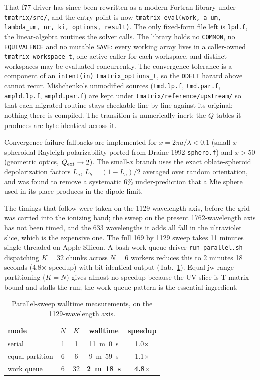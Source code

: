 \documentclass{my_memo}
\newcommand{\Qext}{\ensuremath{Q_{\rm ext}}}
\begin{document}
That f77 driver has since been rewritten as a modern-Fortran library under
\texttt{tmatrix/src/}, and the entry point is now
\texttt{tmatrix\_eval(work, a\_um, lambda\_um, nr, ki, options,
result)}. The only fixed-form file left is \texttt{lpd.f}, the linear-algebra
routines the solver calls. The library holds no \texttt{COMMON}, no
\texttt{EQUIVALENCE} and no mutable \texttt{SAVE}: every working array lives in
a caller-owned \texttt{tmatrix\_workspace\_t}, one active caller for each
workspace, and distinct workspaces may be evaluated concurrently. The
convergence tolerance is a component of an \texttt{intent(in)}
\texttt{tmatrix\_options\_t}, so the \texttt{DDELT} hazard above cannot recur.
Mishchenko's unmodified sources (\texttt{tmd.lp.f}, \texttt{tmd.par.f},
\texttt{ampld.lp.f}, \texttt{ampld.par.f}) are kept under
\texttt{tmatrix/reference/upstream/} so that each migrated routine stays
checkable line by line against its original; nothing there is compiled. The
transition is numerically inert: the $Q$ tables it produces are byte-identical
across it.

Convergence-failure fallbacks are implemented for $x = 2\pi a/\lambda
< 0.1$ (small-$x$ spheroidal Rayleigh polarizability ported from
Draine 1992 \texttt{sphero.f}) and $x > 50$ (geometric optics, $\Qext
\to 2$). The small-$x$ branch uses the exact oblate-spheroid
depolarization factors $L_a$, $L_b = (1-L_a)/2$ averaged over random
orientation, and was found to remove a systematic 6\% under-prediction
that a Mie sphere used in its place produces in the dipole limit.

The timings that follow were taken on the 1129-wavelength axis, before
the grid was carried into the ionizing band; the sweep on the present
1762-wavelength axis has not been timed, and the 633 wavelengths it
adds all fall in the ultraviolet slice, which is the expensive one.
The full 169 by 1129 sweep takes 11 minutes single-threaded on
Apple Silicon. A bash work-queue driver
\texttt{run\_parallel.sh} dispatching $K = 32$ chunks across $N = 6$
workers reduces this to 2 minutes 18 seconds (4.8$\times$ speedup)
with bit-identical output (Tab.~\ref{tab:parallel}). Equal-jw-range
partitioning ($K = N$) gives almost no speedup because the UV slice
is T-matrix-bound and stalls the run; the work-queue pattern is the
essential ingredient.

\begin{table}[h]
\centering
\caption{Parallel-sweep walltime measurements, on the 1129-wavelength
axis.}
\label{tab:parallel}
\begin{tabular}{l c c c c}
\toprule
mode             & $N$ & $K$ & walltime & speedup \\
\midrule
serial           & 1   & 1   &       11~m~0~s &        1.0$\times$ \\
equal partition  & 6   & 6   &       9~m~59~s &        1.1$\times$ \\
work queue       & 6   & 32  & \bfseries 2~m~18~s & \bfseries 4.8$\times$ \\
\bottomrule
\end{tabular}
\end{table}
\end{document}

